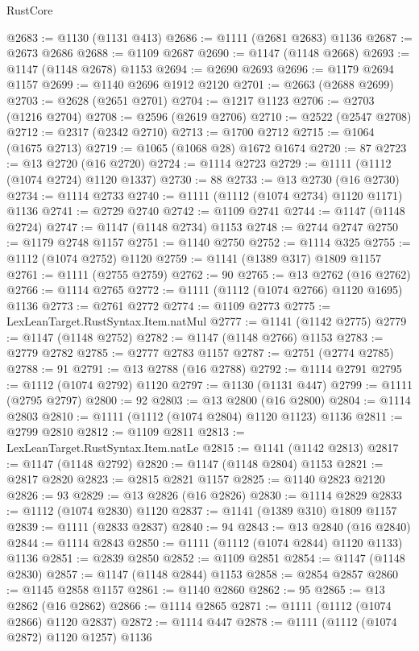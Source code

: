 \begin{lexlean}{RustCore}
\begin{coremodule}
@2683 := @1130 (@1131 @413)
@2686 := @1111 (@2681 @2683) @1136
@2687 := @2673 @2686
@2688 := @1109 @2687
@2690 := @1147 (@1148 @2668)
@2693 := @1147 (@1148 @2678) @1153
@2694 := @2690 @2693
@2696 := @1179 @2694 @1157
@2699 := @1140 @2696 @1912 @2120
@2701 := @2663 (@2688 @2699)
@2703 := @2628 (@2651 @2701)
@2704 := @1217 @1123
@2706 := @2703 (@1216 @2704)
@2708 := @2596 (@2619 @2706)
@2710 := @2522 (@2547 @2708)
@2712 := @2317 (@2342 @2710)
@2713 := @1700 @2712
@2715 := @1064 (@1675 @2713)
@2719 := @1065 (@1068 @28) @1672 @1674
@2720 := 87
@2723 := @13 @2720 (@16 @2720)
@2724 := @1114 @2723
@2729 := @1111 (@1112 (@1074 @2724) @1120 @1337)
@2730 := 88
@2733 := @13 @2730 (@16 @2730)
@2734 := @1114 @2733
@2740 := @1111 (@1112 (@1074 @2734) @1120 @1171) @1136
@2741 := @2729 @2740
@2742 := @1109 @2741
@2744 := @1147 (@1148 @2724)
@2747 := @1147 (@1148 @2734) @1153
@2748 := @2744 @2747
@2750 := @1179 @2748 @1157
@2751 := @1140 @2750
@2752 := @1114 @325
@2755 := @1112 (@1074 @2752) @1120
@2759 := @1141 (@1389 @317) @1809 @1157
@2761 := @1111 (@2755 @2759)
@2762 := 90
@2765 := @13 @2762 (@16 @2762)
@2766 := @1114 @2765
@2772 := @1111 (@1112 (@1074 @2766) @1120 @1695) @1136
@2773 := @2761 @2772
@2774 := @1109 @2773
@2775 := LexLeanTarget.RustSyntax.Item.natMul
@2777 := @1141 (@1142 @2775)
@2779 := @1147 (@1148 @2752)
@2782 := @1147 (@1148 @2766) @1153
@2783 := @2779 @2782
@2785 := @2777 @2783 @1157
@2787 := @2751 (@2774 @2785)
@2788 := 91
@2791 := @13 @2788 (@16 @2788)
@2792 := @1114 @2791
@2795 := @1112 (@1074 @2792) @1120
@2797 := @1130 (@1131 @447)
@2799 := @1111 (@2795 @2797)
@2800 := 92
@2803 := @13 @2800 (@16 @2800)
@2804 := @1114 @2803
@2810 := @1111 (@1112 (@1074 @2804) @1120 @1123) @1136
@2811 := @2799 @2810
@2812 := @1109 @2811
@2813 := LexLeanTarget.RustSyntax.Item.natLe
@2815 := @1141 (@1142 @2813)
@2817 := @1147 (@1148 @2792)
@2820 := @1147 (@1148 @2804) @1153
@2821 := @2817 @2820
@2823 := @2815 @2821 @1157
@2825 := @1140 @2823 @2120
@2826 := 93
@2829 := @13 @2826 (@16 @2826)
@2830 := @1114 @2829
@2833 := @1112 (@1074 @2830) @1120
@2837 := @1141 (@1389 @310) @1809 @1157
@2839 := @1111 (@2833 @2837)
@2840 := 94
@2843 := @13 @2840 (@16 @2840)
@2844 := @1114 @2843
@2850 := @1111 (@1112 (@1074 @2844) @1120 @1133) @1136
@2851 := @2839 @2850
@2852 := @1109 @2851
@2854 := @1147 (@1148 @2830)
@2857 := @1147 (@1148 @2844) @1153
@2858 := @2854 @2857
@2860 := @1145 @2858 @1157
@2861 := @1140 @2860
@2862 := 95
@2865 := @13 @2862 (@16 @2862)
@2866 := @1114 @2865
@2871 := @1111 (@1112 (@1074 @2866) @1120 @2837)
@2872 := @1114 @447
@2878 := @1111 (@1112 (@1074 @2872) @1120 @1257) @1136

\end{coremodule}
\end{lexlean}
